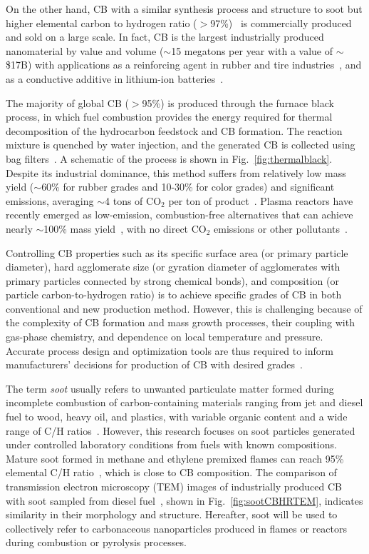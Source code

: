 On the other hand, CB with a similar synthesis process and structure to soot but higher elemental carbon to hydrogen ratio ($>$97\%)~\citep{watson2001carbon} is commercially produced and sold on a large scale. In fact, CB is the largest industrially produced nanomaterial by value and volume ($\sim$15 megatons per year with a value of $\sim$\$17B) with applications as a reinforcing agent in rubber and tire industries~\citep{international2016carbon}, and as a conductive additive in lithium-ion batteries~\citep{Palomares2010}. 


The majority of global CB ($>$95\%) is produced through the furnace black process, in which fuel combustion provides the energy required for thermal decomposition of the hydrocarbon feedstock and CB formation. The reaction mixture is quenched by water injection, and the generated CB is collected using bag filters~\citep{wiley2012processing}. A schematic of the process is shown in Fig.~\ref{fig:thermalblack}. Despite its industrial dominance, this method suffers from relatively low mass yield ($\sim$60\% for rubber grades and 10-30\% for color grades) and significant emissions, averaging $\sim$4 tons of CO$_2$ per ton of product~\citep{bansal1993carbon}. Plasma reactors have recently emerged as low-emission, combustion-free alternatives that can achieve nearly $\sim$100\% mass yield~\cite{fulcheri2023energy}, with no direct CO$_2$ emissions or other pollutants~\citep{cho2004conversion}.

Controlling CB properties such as its specific surface area (or primary particle diameter), hard agglomerate size (or gyration diameter of agglomerates with primary particles connected by strong chemical bonds), and composition (or particle carbon-to-hydrogen ratio) is to achieve specific grades of CB in both conventional and new production method. However, this is challenging because of the complexity of CB formation and mass growth processes, their coupling with gas-phase chemistry, and dependence on local temperature and pressure. Accurate process design and optimization tools are thus required to inform manufacturers' decisions for production of CB with desired grades~\citep{park2005influence}.

 
The term \textit{soot} usually refers to unwanted particulate matter formed during incomplete combustion of carbon-containing materials ranging from jet and diesel fuel to wood, heavy oil, and plastics, with variable organic content and a wide range of C/H ratios~\citep{watson2001carbon}. However, this research focuses on soot particles generated under controlled laboratory conditions from fuels with known compositions. Mature soot formed in methane and ethylene premixed flames can reach 95\% elemental C/H ratio~\citep{russo2015dehydrogenation}, which is close to CB composition. The comparison of transmission electron microscopy (TEM) images of industrially produced CB~\citep{singh2018nanostructure} with soot sampled from diesel fuel~\citep{vander2007hrtem, lapuerta2017morphological}, shown in Fig.~\ref{fig:sootCBHRTEM}, indicates similarity in their morphology and structure. Hereafter, soot will be used to collectively refer to carbonaceous nanoparticles produced in flames or reactors during combustion or pyrolysis processes.

